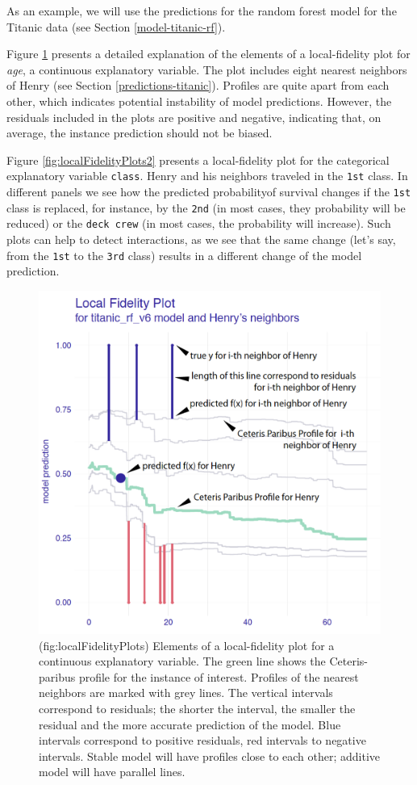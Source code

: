 \documentclass[12pt,]{krantz}
\begin{document}
As an example, we will use the predictions for the random forest model for the Titanic data (see Section \ref{model-titanic-rf}).

Figure \ref{fig:localFidelityPlots} presents a detailed explanation of the elements of a local-fidelity plot for \emph{age}, a continuous explanatory variable. The plot includes eight nearest neighbors of Henry (see Section \ref{predictions-titanic}). Profiles are quite apart from each other, which indicates potential instability of model predictions. However, the residuals included in the plots are positive and negative, indicating that, on average, the instance prediction should not be biased.

Figure \ref{fig:localFidelityPlots2} presents a local-fidelity plot for the categorical explanatory variable \texttt{class}. Henry and his neighbors traveled in the \texttt{1st} class. In different panels we see how the predicted probabilityof survival changes if the \texttt{1st} class is replaced, for instance, by the \texttt{2nd} (in most cases, they probability will be reduced) or the \texttt{deck\ crew} (in most cases, the probability will increase). Such plots can help to detect interactions, as we see that the same change (let's say, from the \texttt{1st} to the \texttt{3rd} class) results in a different change of the model prediction.

\begin{figure}

{\centering \includegraphics[width=0.7\linewidth]{figure/localFidelityPlots} 

}

\caption{(fig:localFidelityPlots) Elements of a local-fidelity plot for a continuous explanatory variable. The green line shows the Ceteris-paribus profile for the instance of interest. Profiles of the nearest neighbors are marked with grey lines. The vertical intervals correspond to residuals; the shorter the interval, the smaller the residual and the more accurate prediction of the model. Blue intervals correspond to positive residuals, red intervals to negative intervals. Stable model will have profiles close to each other; additive model will have parallel lines.}\label{fig:localFidelityPlots}
\end{figure}
\end{document}
